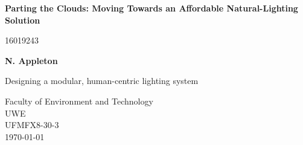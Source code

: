 \documentclass[twoside,twocolumn]{report}
\begin{document}
\begin{titlepage}

    \begin{center}
        \vspace*{1cm}
            
        \Huge
        \textbf{Parting the Clouds: Moving Towards an Affordable Natural-Lighting Solution}
            
        \vspace{0.5cm}
        \LARGE
        16019243
            
        \vspace{1.5cm}
            
        \textbf{N. Appleton}
            
        \vfill
            
        Designing a modular, human-centric lighting system            
            
        \vspace{0.8cm}
            
        \Large
        Faculty of Environment and Technology\\
        UWE\\
        UFMFX8-30-3 \\
        \today
            
    \end{center}
\end{titlepage}

\tableofcontents 
\clearpage \newpage






\clearpage
\newpage

\printbibliography[title={References},category=cited, heading=bibintoc]%

\printbibliography[notcategory=cited, heading=bibintoc]
\end{document}
